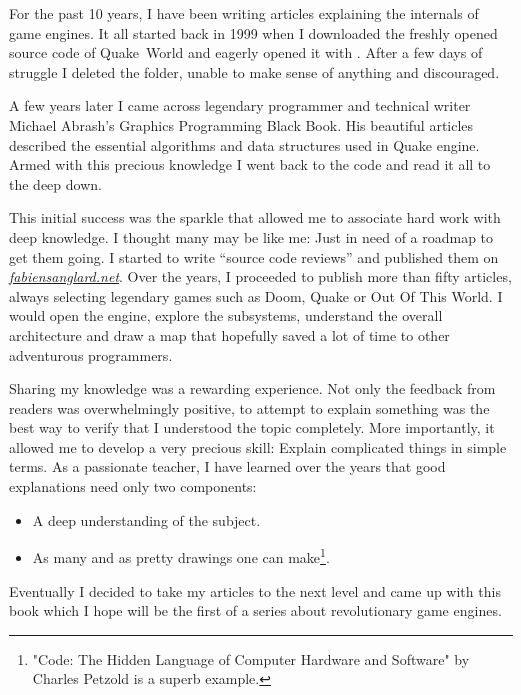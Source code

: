 \documentclass[book.tex]{subfiles}
\begin{document}
For the past 10 years, I have been writing articles explaining the internals of game engines. It all started back in 1999 when I downloaded the freshly opened source code of \mbox{Quake World} and eagerly opened it with . After a few days of struggle I deleted the  folder, unable to make sense of anything and discouraged.

\bigskip

A few years later I came across legendary programmer and technical writer Michael Abrash's Graphics Programming Black Book. His beautiful articles described the essential algorithms and data structures used in Quake engine. Armed with this precious knowledge I went back to the code and read it all to the deep down.

\bigskip

This initial success was the sparkle that allowed me to associate hard work with deep knowledge. I thought many may be like me: Just in need of a roadmap to get them going. I started to write ``source  code reviews'' and published them on 
\href{http://fabiensanglard.net}{\textit{fabiensanglard.net}}. Over the years, I proceeded to publish more than fifty articles, always selecting legendary games such as Doom, Quake or Out Of This World. I would open the engine, explore the subsystems, understand the overall architecture and draw a map that hopefully saved a lot of time to other adventurous programmers.

\bigskip

Sharing my knowledge was a rewarding experience. Not only the feedback from readers was overwhelmingly positive, to attempt to explain something was the best way to verify that I understood the topic completely. More importantly, it allowed me to develop a very precious skill: Explain complicated things in simple terms. As a passionate teacher, I have learned over the years that good explanations need only two components: 
\begin{itemize} 
\item A deep understanding of the subject. 
\item As many and as pretty drawings one can make\footnote{"Code: The Hidden Language of Computer Hardware and Software" by Charles Petzold is a superb example.}.
\end{itemize} 

\bigskip

Eventually I decided to take my articles to the next level and came up with this book which I hope will be the first of a series about revolutionary game engines. 
\end{document}
